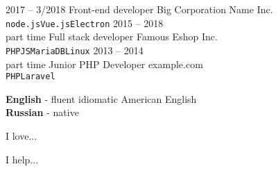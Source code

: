 \documentclass[9pt]{developercv} %
\begin{document}
\begin{entrylist}
	\entry
		{2017 -- 3/2018}
		{Front-end developer}
		{Big Corporation Name Inc.}
		{\lorem \lorem \lorem\\ \texttt{node.js}\slashsep\texttt{Vue.js}\slashsep\texttt{Electron}}
	\entry
		{2015 -- 2018\\\footnotesize{part time}}
		{Full stack developer}
		{Famous Eshop Inc.}
		{\lorem\lorem\\ \texttt{PHP}\slashsep\texttt{JS}\slashsep\texttt{MariaDB}\slashsep\texttt{Linux}}
	\entry
		{2013 -- 2014\\\footnotesize{part time}}
		{Junior PHP Developer}
		{example.com}
		{\lorem\lorem\\ \texttt{PHP}\slashsep\texttt{Laravel}}
\end{entrylist}


\begin{minipage}[t]{0.3\textwidth}
	\vspace{-\baselineskip} %

	
	\textbf{English} - fluent idiomatic American English\\
	\textbf{Russian} - native\\
\end{minipage}
\hfill
\begin{minipage}[t]{0.3\textwidth}
	\vspace{-\baselineskip} %
	
	
	I love... \lorem
\end{minipage}
\hfill
\begin{minipage}[t]{0.3\textwidth}
	\vspace{-\baselineskip} %
	
	
	I help... \lorem
\end{minipage}

\end{document}
